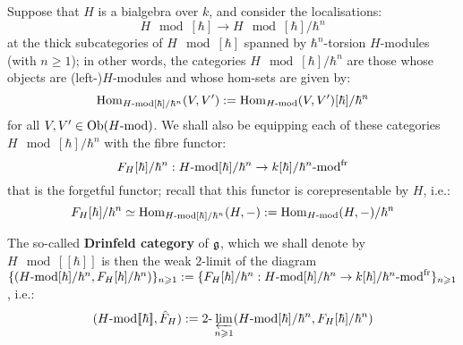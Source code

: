         \begin{definition} \label{def: drinfeld_categories_of_finite_type_bialgebras}
            Suppose that $H$ is a bialgebra over $k$, and consider the localisations:
                $$H\mod[\hbar] \to H\mod[\hbar]/\hbar^n$$
            at the thick subcategories of $H\mod[\hbar]$ spanned by $\hbar^n$-torsion $H$-modules (with $n \geq 1$); in other words, the categories $H\mod[\hbar]/\hbar^n$ are those whose objects are (left-)$H$-modules and whose hom-sets are given by:
                $$\Hom_{H\mod[\hbar]/\hbar^n}(V, V') := \Hom_{H\mod}(V, V')[\hbar]/\hbar^n$$
            for all $V, V' \in \Ob(H\mod)$. We shall also be equipping each of these categories $H\mod[\hbar]/\hbar^n$ with the fibre functor:
                $$F_H[\hbar]/\hbar^n: H\mod[\hbar]/\hbar^n \to k[\hbar]/\hbar^n\mod^{\fr}$$
            that is the forgetful functor; recall that this functor is corepresentable by $H$, i.e.:
                $$F_H[\hbar]/\hbar^n \cong \Hom_{H\mod[\hbar]/\hbar^n}(H, -) := \Hom_{H\mod}(H, -)/\hbar^n$$
                
            The so-called \textbf{Drinfeld category} of $\g$, which we shall denote by $H\mod[\![\hbar]\!]$ is then the weak $2$-limit of the diagram $\{ ( H\mod[\hbar]/\hbar^n, F_H[\hbar]/\hbar^n ) \}_{n \geq 1} := \{ F_H[\hbar]/\hbar^n: H\mod[\hbar]/\hbar^n \to k[\hbar]/\hbar^n\mod^{\fr} \}_{n \geq 1}$, i.e.:
                $$( H\mod[\![\hbar]\!], \hat{F}_H ) := 2\-\projlim_{n \geq 1} ( H\mod[\hbar]/\hbar^n, F_H[\hbar]/\hbar^n )$$
        \end{definition}
